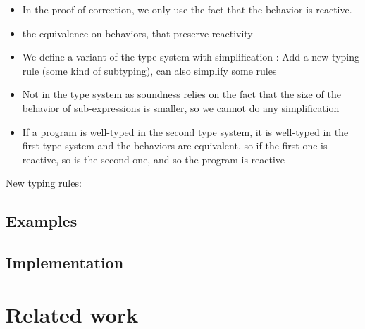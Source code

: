 \documentclass[9pt,preprint]{sigplanconf}
\begin{document}
\begin{itemize}
\item In the proof of correction, we only use the fact that the behavior is reactive.
\item the equivalence on behaviors, that preserve reactivity
\item We define a variant of the type system with simplification : Add a new typing rule (some kind of subtyping), can also simplify some rules
\item Not in the type system as soundness relies on the fact that the size of the behavior of sub-expressions is smaller, so we cannot do any simplification
\item If a program is well-typed in the second type system, it is well-typed in the first type system and the behaviors are equivalent, so if the first one is reactive, so is the second one, and so the program is reactive
\end{itemize}

New typing rules:

\subsection{Examples}


\subsection{Implementation}

\section{Related work}
\end{document}
